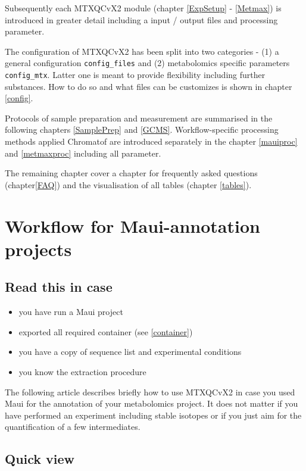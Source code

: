 \documentclass[]{book}
\providecommand{\tightlist}{%
  \setlength{\itemsep}{0pt}\setlength{\parskip}{0pt}}
\begin{document}
Subsequently each MTXQCvX2 module (chapter \ref{ExpSetup} -
\ref{Metmax}) is introduced in greater detail including a input / output
files and processing parameter.

The configuration of MTXQCvX2 has been split into two categories - (1) a
general configuration \texttt{config\_files} and (2) metabolomics
specific parameters \texttt{config\_mtx}. Latter one is meant to provide
flexibility including further substances. How to do so and what files
can be customizes is shown in chapter \ref{config}.

Protocols of sample preparation and measurement are summarised in the
following chapters \ref{SamplePrep} and \ref{GCMS}. Workflow-specific
processing methods applied Chromatof are introduced separately in the
chapter \ref{mauiproc} and \ref{metmaxproc} including all parameter.

The remaining chapter cover a chapter for frequently asked questions
(chapter\ref{FAQ}) and the visualisation of all tables (chapter
\ref{tables}).

\hypertarget{wf:maui}{\chapter{Workflow for Maui-annotation
projects}\label{wf:maui}}

\section{Read this in case}\label{read-this-in-case}

\begin{itemize}
\tightlist
\item
  you have run a Maui project
\item
  exported all required container (see \ref{container})
\item
  you have a copy of sequence list and experimental conditions
\item
  you know the extraction procedure
\end{itemize}

The following article describes briefly how to use MTXQCvX2 in case you
used Maui for the annotation of your metabolomics project. It does not
matter if you have performed an experiment including stable isotopes or
if you just aim for the quantification of a few intermediates.

\section{Quick view}\label{quick-view}
\end{document}

